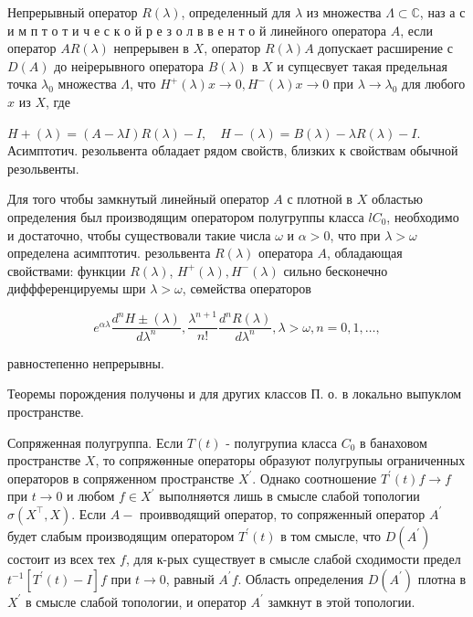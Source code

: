 \documentclass[10pt]{article}
\begin{document}
Непрерывный оператор $R(\lambda)$, определенный для $\lambda$ из множества $\Lambda \subset \mathbb{C}$, наз а с и м п т о т и ч е с к о й р е з о л в в е н т о й линейного оператора $A$, если оператор $A R(\lambda)$ непрерывен в $X$, оператор $R(\lambda) A$ допускает расширение с $D(A)$ до неірерывного оператора $B(\lambda)$ в $X$ и супцесвует такая предельная точка $\lambda_{0}$ множества $\Lambda$, что $H^{+}(\lambda) x \rightarrow 0, H^{-}(\lambda) x \rightarrow 0$ при $\lambda \rightarrow \lambda_{0}$ для любого $x$ из $X$, где



$H+(\lambda)=(A-\lambda I) R(\lambda)-I, \quad H-(\lambda)=B(\lambda)-\lambda R(\lambda)-I$. Асимптотич. резольвента обладает рядом свойств, близких к свойствам обычной резольвенты.



Для того чтобы замкнутый линейный оператор $A$ с плотной в $X$ областью определения был производящим оператором полугруппы класса $l C_{0}$, необходимо и достаточно, чтобы существовали такие числа $\omega$ и $\alpha>0$, что при $\lambda>\omega$ определена асимптотич. резольвента $R(\lambda)$ оператора $A$, обладающая свойствами: функции $R(\lambda)$, $H^{+}(\lambda), H^{-}(\lambda)$ сильно бесконечно диффференцируемы шри $\lambda>\omega$, сөмейства операторов



\[

e^{\alpha \lambda} \frac{d^{n} H \pm(\lambda)}{d \lambda^{n}}, \frac{\lambda^{n+1}}{n !} \frac{d^{n} R(\lambda)}{d \lambda^{n}}, \lambda>\omega, n=0,1, \ldots,

\]



равностепенно непрерывны.



Теоремы порождения получөны и для других классов П. о. в локально выпуклом пространстве.



Сопряженная полугруппа. Если $T(t)$ - полугрупиа класса $C_{0}$ в банаховом пространстве $X$, то сопряжөнные операторы образуют полугрупыы ограниченных операторов в сопряженном пространстве $X^{\prime}$. Однако соотношение $T^{\prime}(t) f \rightarrow f$ при $t \rightarrow 0$ и любом $f \in X^{\prime}$ выполняөтся лишь в смысле слабой топологии $\sigma\left(X^{\top}, X\right)$. Если $A-$ проивводящий оператор, то сопряженный оператор $A^{\prime}$ будет слабым производящим оператором $T^{\prime}(t)$ в том смысле, что $D\left(A^{\prime}\right)$ состоит из всех тех $f$, для к-рых существует в смысле слабой сходимости предел $t^{-1}\left[T^{\prime}(t)-I\right] f$ при $t \rightarrow 0$, равный $A^{\prime} f$. Область определения $D\left(A^{\prime}\right)$ плотна в $X^{\prime}$ в смысле слабой топологии, и оператор $A^{\prime}$ замкнут в этой топологии.
\end{document}
